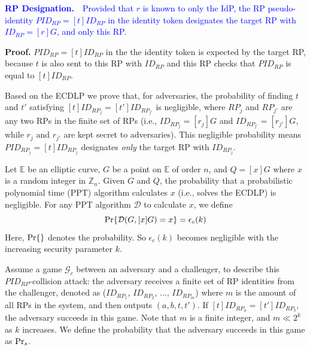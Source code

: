 \vspace{1mm}
\noindent\textcolor{blue}{\textbf{RP Designation.}~~Provided that $r$ is known to only the IdP,
the RP pseudo-identity $PID_{RP} = [t]ID_{RP}$ in the identity token
     designates the target RP with $ID_{RP} = [r]G$, and only this RP.}

\vspace{0.75mm}
\noindent\textbf{Proof.}
$PID_{RP} = [t]ID_{RP}$ in the the identity token is expected by the target RP,
    because $t$ is also sent to this RP with $ID_{RP}$
     and this RP checks that $PID_{RP}$ is equal to $[t]ID_{RP}$.


Based on the ECDLP
    we prove that,
    for adversaries,
        the probability of finding $t$ and $t'$
    satisfying $[t]ID_{RP_j} = [t']ID_{RP_{j'}}$ is negligible,
    where $RP_j$ and $RP_{j'}$ are any two RPs in the finite set of RPs (i.e.,
    $ID_{RP_j} = [r_j]G$ and $ID_{RP_{j'}} = [r_{j'}]G$, while $r_j$ and $r_{j'}$ are kept secret to adversaries).
This negligible probability means $PID_{RP_j} = [t]ID_{RP_j}$ designates \emph{only} the target RP with $ID_{RP_j}$.

Let $\mathbb{E}$ be an elliptic curve, %
    $G$ be a point on $\mathbb{E}$ of order $n$,
        and $Q = [x]G$ where $x$ is a random integer in $\mathbb{Z}_n$.
Given $G$ and $Q$,
    the probability that a probabilistic polynomial time (PPT) algorithm calculates $x$ (i.e., solves the ECDLP) is negligible.
For any PPT algorithm $\mathcal{D}$ to calculate $x$, we define
\begin{equation*}
{\rm Pr}\{\mathcal{D}(G, [x]G)=x\} = \epsilon_{c}(k)
\end{equation*}
Here, ${\rm Pr}\{\}$ denotes the probability.
So $\epsilon_{c}(k)$ becomes negligible with the increasing security parameter $k$.

Assume a game $\mathcal{G}_c$ between an adversary and a challenger,
    to describe this $PID_{RP}$-collision attack:
the adversary receives a finite set of RP identities from the challenger,
 denoted as ($ID_{RP_1}$, $ID_{RP_2}$, ..., $ID_{RP_m}$)
 where $m$ is the amount of all RPs in the system,
  and then outputs $(a, b, t, t')$.
If $[t]ID_{RP_a}=[t']ID_{RP_b}$, the adversary succeeds in this game.
Note that $m$ is a finite integer, and $m \ll 2^k$ as $k$ increases.
We define the probability that the adversary succeeds in this game as ${\rm Pr}_s$.


